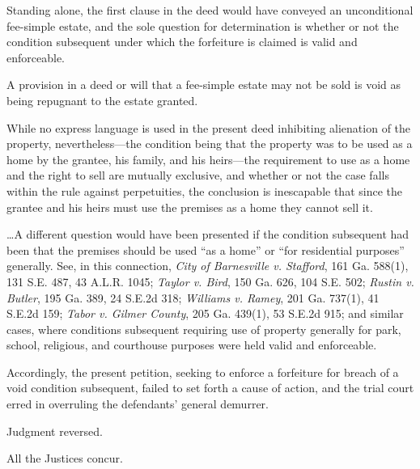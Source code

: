 Standing alone, the first clause in the deed would have conveyed an
unconditional fee-simple estate, and the sole question for determination is
whether or not the condition subsequent under which the forfeiture is claimed
is valid and enforceable.

A provision in a deed or will that a fee-simple estate may not be sold is void
as being repugnant to the estate granted.

While no express language is used in the present deed inhibiting alienation of
the property, nevertheless---the condition being that the property was to be
used as a home by the grantee, his family, and his heirs---the requirement to
use as a home and the right to sell are mutually exclusive, and whether or not
the case falls within the rule against perpetuities, the conclusion is
inescapable that since the grantee and his heirs must use the premises as a
home they cannot sell it.

\dots A different question would have been presented if the condition subsequent
had been that the premises should be used ``as a home'' or ``for residential
purposes'' generally. See, in this connection, \emph{City of Barnesville v.
Stafford}, 161 Ga. 588(1), 131 S.E. 487, 43 A.L.R. 1045; \emph{Taylor v. Bird},
150 Ga. 626, 104 S.E. 502; \emph{Rustin v. Butler}, 195 Ga. 389, 24 S.E.2d 318;
\emph{Williams v. Ramey}, 201 Ga. 737(1), 41 S.E.2d 159; \emph{Tabor v. Gilmer
County}, 205 Ga. 439(1), 53 S.E.2d 915; and similar cases, where conditions
subsequent requiring use of property generally for park, school, religious, and
courthouse purposes were held valid and enforceable.

Accordingly, the present petition, seeking to enforce a forfeiture for breach of
a void condition subsequent, failed to set forth a cause of action, and the
trial court erred in overruling the defendants' general demurrer.

Judgment reversed.

All the Justices concur.

